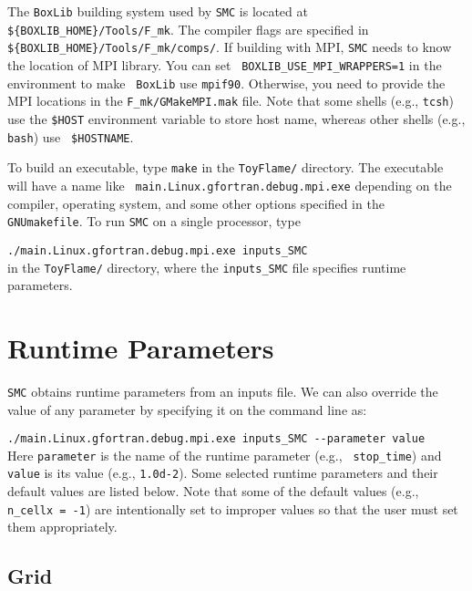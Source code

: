 \documentclass[11pt,letterpaper]{article}
\begin{document}
The {\tt BoxLib} building system used by {\tt SMC} is located at {\tt
  \$\{BOXLIB\_HOME\}/Tools/F\_mk}.  The compiler flags are specified
in {\tt \$\{BOXLIB\_HOME\}/Tools/F\_mk/comps/}.  If building with MPI,
{\tt SMC} needs to know the location of MPI library.  You can set {\tt
  BOXLIB\_USE\_MPI\_WRAPPERS=1} in the environment to make {\tt
  BoxLib} use {\tt mpif90}.  Otherwise, you need to provide the MPI
locations in the {\tt F\_mk/GMakeMPI.mak} file.  Note that some shells
(e.g., {\tt tcsh}) use the {\tt \$HOST} environment variable to store
host name, whereas other shells (e.g., {\tt bash}) use {\tt
  \$HOSTNAME}.

To build an executable, type {\tt make} in the {\tt ToyFlame/}
directory.  The executable will have a name like {\tt
  main.Linux.gfortran.debug.mpi.exe} depending on the compiler,
operating system, and some other options specified in the {\tt
  GNUmakefile}.  To run {\tt SMC} on a single processor, type
\vspace{5pt}

\verb|./main.Linux.gfortran.debug.mpi.exe inputs_SMC|\vspace{5pt}\\
in the {\tt ToyFlame/} directory, where the {\tt inputs\_SMC} file
specifies runtime parameters.

\section{Runtime Parameters}

{\tt SMC} obtains runtime parameters from an inputs file.  We can also
override the value of any parameter by specifying it on the
command line as:\vspace{5pt}

\verb|./main.Linux.gfortran.debug.mpi.exe inputs_SMC --parameter value|\\

Here {\tt parameter} is the name of the runtime parameter (e.g., {\tt
  stop\_time}) and {\tt value} is its value (e.g., {\tt 1.0d-2}).
Some selected runtime parameters and their default values are listed
below.  Note that some of the default values (e.g., {\tt n\_cellx =
  -1}) are intentionally set to improper values so that the user must
set them appropriately.

\subsection{Grid}
\end{document}
